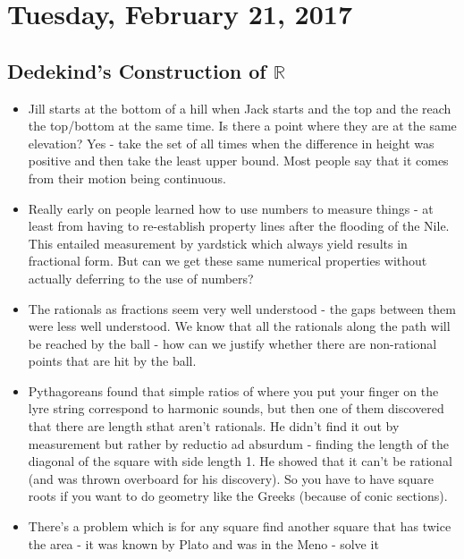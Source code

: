\documentclass[12pt]{article}
\theoremstyle{definition}
\begin{document}
\section{Tuesday, February 21, 2017}

\subsection{Dedekind's Construction of $\mathbb{R}$}

\begin{itemize}
    \itemsep0em 
    \item  
        Jill starts at the bottom of a hill when Jack starts and the top and
        the reach the top/bottom at the same time. Is there a point where they
        are at the same elevation? Yes - take the set of all times when the
        difference in height was positive and then take the least upper bound.
        Most people say that it comes from their motion being continuous.
    \item
        Really early on people learned how to use numbers to measure things -
        at least from having to re-establish property lines after the flooding
        of the Nile. This entailed measurement by yardstick which always yield
        results in fractional form. But can we get these same numerical
        properties without actually deferring to the use of numbers? 
    \item
        The rationals as fractions seem very well understood - the gaps between
        them were less well understood. We know that all the rationals along
        the path will be reached by the ball - how can we justify whether there
        are non-rational points that are hit by the ball.
    \item
        Pythagoreans found that simple ratios of where you put your finger on
        the lyre string correspond to harmonic sounds, but then one of them
        discovered that there are length sthat aren't rationals. He
        didn't find it out by measurement but rather by reductio ad absurdum -
        finding the length of the diagonal of the square with side length 1. He
        showed that it can't be rational (and was thrown overboard for his
        discovery). So you have to have square roots if you want to do geometry
        like the Greeks (because of conic sections).
    \item
        There's a problem which is for any square find another square that has
        twice the area - it was known by Plato and was in the Meno - solve it

\end{itemize}
\end{document}
